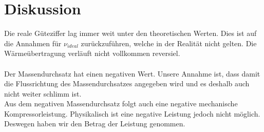 \section{Diskussion}
\label{sec:Diskussion}

Die reale Güteziffer lag immer weit unter den theoretischen Werten. Dies ist auf die Annahmen für $ν_{ideal}$ zurückzuführen,
welche in der Realität nicht gelten. Die Wärmeübertragung verläuft nicht vollkommen reversiel.
\\
\\
Der Massendurchsatz hat einen negativen Wert. Unsere Annahme ist, dass damit die Flussrichtung des Massendurchsatzes angegeben wird 
und es deshalb auch nicht weiter schlimm ist.
\\
Aus dem negativen Massendurchsatz folgt auch eine negative mechanische Kompressorleistung. Physikalisch ist eine negative Leistung jedoch nicht möglich. 
Deswegen haben wir den Betrag der Leistung genommen.\\
\newpage